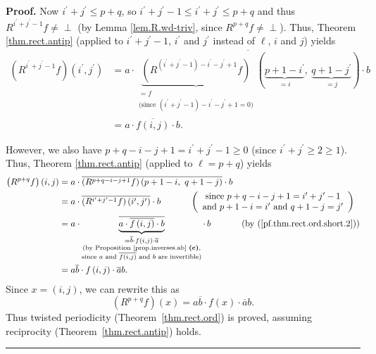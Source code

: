 \documentclass[numbers=enddot,12pt,final,onecolumn,notitlepage]{scrartcl}%
\theoremstyle{definition}
\newenvironment{vershort}{}{}
\newcommand{\undf}{\operatorname*{\bot}}
\newenvironment{proof}[1][Proof]{\noindent\textbf{#1.} }{\ \rule{0.5em}{0.5em}}
\begin{document}
\begin{vershort}
\begin{proof}
Now $i^{\prime}+j^{\prime}\leq p+q$, so $i^{\prime}+j^{\prime}-1\leq
i^{\prime}+j^{\prime}\leq p+q$ and thus $R^{i^{\prime}+j^{\prime}-1}%
f\neq\undf$ (by Lemma \ref{lem.R.wd-triv}, since $R^{p+q}f\neq\undf$). Thus,
Theorem \ref{thm.rect.antip} (applied to $i^{\prime}+j^{\prime}-1$,
$i^{\prime}$ and $j^{\prime}$ instead of $\ell$, $i$ and $j$) yields%
\begin{align}
\left(  R^{i^{\prime}+j^{\prime}-1}f\right)  \left(  i^{\prime},j^{\prime
}\right)   &  =a\cdot\overline{\underbrace{\left(  R^{\left(  i^{\prime
}+j^{\prime}-1\right)  -i^{\prime}-j^{\prime}+1}f\right)  }%
_{\substack{=f\\\text{(since }\left(  i^{\prime}+j^{\prime}-1\right)
-i^{\prime}-j^{\prime}+1=0\text{)}}}\left(  \underbrace{p+1-i^{\prime}}%
_{=i},\ \underbrace{q+1-j^{\prime}}_{=j}\right)  }\cdot b\nonumber\\
&  =a\cdot\overline{f\left(  i,j\right)  }\cdot b.
\label{pf.thm.rect.ord.short.2}%
\end{align}


However, we also have $p+q-i-j+1=i^{\prime}+j^{\prime}-1\geq0$ (since
$i^{\prime}+j^{\prime}\geq2\geq1$). Thus, Theorem \ref{thm.rect.antip}
(applied to $\ell=p+q$) yields%
\begin{align*}
\left(  R^{p+q}f\right)  \left(  i,j\right)   &  =a\cdot\overline{\left(
R^{p+q-i-j+1}f\right)  \left(  p+1-i,\ q+1-j\right)  }\cdot b\\
&  =a\cdot\overline{\left(  R^{i^{\prime}+j^{\prime}-1}f\right)  \left(
i^{\prime},j^{\prime}\right)  }\cdot b\ \ \ \ \ \ \ \ \ \ \left(
\begin{array}
[c]{c}%
\text{since }p+q-i-j+1=i^{\prime}+j^{\prime}-1\\
\text{and }p+1-i=i^{\prime}\text{ and }q+1-j=j^{\prime}%
\end{array}
\right) \\
&  =a\cdot\underbrace{\overline{a\cdot\overline{f\left(  i,j\right)  }\cdot
b}}_{\substack{=\overline{b}\cdot f\left(  i,j\right)  \cdot\overline
{a}\\\text{(by Proposition \ref{prop.inverses.ab} \textbf{(c)},}\\\text{since
}a\text{ and }\overline{f\left(  i,j\right)  }\text{ and }b\text{ are
invertible)}}}\cdot\,b\ \ \ \ \ \ \ \ \ \ \left(  \text{by
(\ref{pf.thm.rect.ord.short.2})}\right) \\
&  =a\overline{b}\cdot f\left(  i,j\right)  \cdot\overline{a}b.
\end{align*}
Since $x=\left(  i,j\right)  $, we can rewrite this as%
\[
\left(  R^{p+q}f\right)  \left(  x\right)  =a\overline{b}\cdot f\left(
x\right)  \cdot\overline{a}b.
\]
Thus twisted periodicity (Theorem~\ref{thm.rect.ord}) is proved, assuming
reciprocity (Theorem~\ref{thm.rect.antip}) holds.
\end{proof}
\end{vershort}
\end{document}
